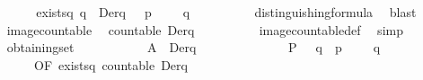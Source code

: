 \begin{isabellebody}
\ \ \ \ \isanewline
\ \ \ \ \isamarkupfalse%
\ {\isachardoublequoteopen}exists{\isacharunderscore}{\kern0pt}{\isasymphi}\isactrlbsub q{\isacharprime}{\kern0pt}\isactrlesub {\isachardoublequoteclose}{\isacharcolon}{\kern0pt}\ {\isacartoucheopen}{\isasymforall}q{\isacharprime}{\kern0pt}\ {\isasymin}\ Der{\isacharparenleft}{\kern0pt}q{\isacharcomma}{\kern0pt}\ {\isasymalpha}{\isacharparenright}{\kern0pt}{\isachardot}{\kern0pt}\ {\isasymexists}{\isasymphi}{\isachardot}{\kern0pt}\ p{\isacharprime}{\kern0pt}\ {\isasymTurnstile}\ {\isasymphi}\ {\isasymand}\ {\isasymnot}\ q{\isacharprime}{\kern0pt}\ {\isasymTurnstile}\ {\isasymphi}{\isacartoucheclose}\isanewline
\ \ \ \ \ \ \isamarkupfalse%
\ distinguishing{\isacharunderscore}{\kern0pt}formula\ \isamarkupfalse%
\ blast\isanewline
\isanewline
\ \ \ \ \isamarkupfalse%
\ {\isacartoucheopen}image{\isacharunderscore}{\kern0pt}countable{\isacartoucheclose}\ \isamarkupfalse%
\ {\isacartoucheopen}countable\ Der{\isacharparenleft}{\kern0pt}q{\isacharcomma}{\kern0pt}\ {\isasymalpha}{\isacharparenright}{\kern0pt}{\isacartoucheclose}\ \isanewline
\ \ \ \ \ \ \isamarkupfalse%
\ image{\isacharunderscore}{\kern0pt}countable{\isacharunderscore}{\kern0pt}def\ \isamarkupfalse%
\ simp\isanewline
\isanewline
\ \ \ \ \isamarkupfalse%
\ obtaining{\isacharunderscore}{\kern0pt}set{\isacharbrackleft}{\kern0pt}\isanewline
\ \ \ \ \ \ \ \ \ \ \ {\isacharquery}{\kern0pt}A\ {\isacharequal}{\kern0pt}\ {\isacartoucheopen}Der{\isacharparenleft}{\kern0pt}q{\isacharcomma}{\kern0pt}\ {\isasymalpha}{\isacharparenright}{\kern0pt}{\isacartoucheclose}\isanewline
\ \ \ \ \ \ \ \ \ \ \ \ \ {\isacharquery}{\kern0pt}P\ {\isacharequal}{\kern0pt}\ {\isacartoucheopen}{\isasymlambda}\ q{\isacharprime}{\kern0pt}\ {\isasymphi}{\isachardot}{\kern0pt}\ p{\isacharprime}{\kern0pt}\ {\isasymTurnstile}\ {\isasymphi}\ {\isasymand}\ {\isasymnot}\ q{\isacharprime}{\kern0pt}\ {\isasymTurnstile}\ {\isasymphi}{\isacartoucheclose}{\isacharcomma}{\kern0pt}\ \isanewline
\ \ \ \ \ \ \ \ \ \ OF\ {\isachardoublequoteopen}exists{\isacharunderscore}{\kern0pt}{\isasymphi}\isactrlbsub q{\isacharprime}{\kern0pt}\isactrlesub {\isachardoublequoteclose}\ {\isacartoucheopen}countable\ Der{\isacharparenleft}{\kern0pt}q{\isacharcomma}{\kern0pt}\ {\isasymalpha}{\isacharparenright}{\kern0pt}{\isacartoucheclose}{\isacharbrackright}{\kern0pt}\isanewline
\ \ \ \ \isamarkupfalse%
\ {\isasymPhi}\ \ {\isacharasterisk}{\kern0pt}{\isacharcolon}{\kern0pt}\isanewline

\end{isabellebody}
